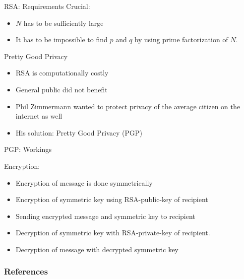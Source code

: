 \documentclass[handout]{beamer}
\begin{document}
\begin{frame}{RSA: Requirements}
	Crucial: 
	\begin{itemize}
		\item<1-> \(N\) has to be sufficiently large
		\item<2-> It has to be impossible to find \(p\) and \(q\) by using prime factorization of \(N\).
	\end{itemize}
\end{frame}

\begin{frame}{Pretty Good Privacy}
		\begin{itemize}
			\item<1->RSA is computationally costly
			\item<2->General public did not benefit 
			\item<3->Phil Zimmermann wanted to protect privacy of the average citizen on the internet as well
			\item<4->His solution: Pretty Good Privacy (PGP)
		\end{itemize}
\end{frame}

\begin{frame}{PGP: Workings}
	\begin{minipage}[T][5cm][t]{0.45\textwidth}
		Encryption:
		\begin{itemize}
			\item<1->Encryption of message is done symmetrically
			\item<2->Encryption of symmetric key using RSA-public-key of recipient
			\item<3->Sending encrypted message and symmetric key to recipient
		\end{itemize}
	\end{minipage}
	\hfill
	\begin{minipage}[T][5cm][t]{0.45\textwidth}
		\begin{itemize}
			\item<4->Decryption of symmetric key with RSA-private-key of recipient.
			\item<5->Decryption of message with decrypted symmetric key
		\end{itemize}
	\end{minipage}
\end{frame}

\begin{frame}%
	\frametitle{References}
	
	
\end{frame}
\end{document}
